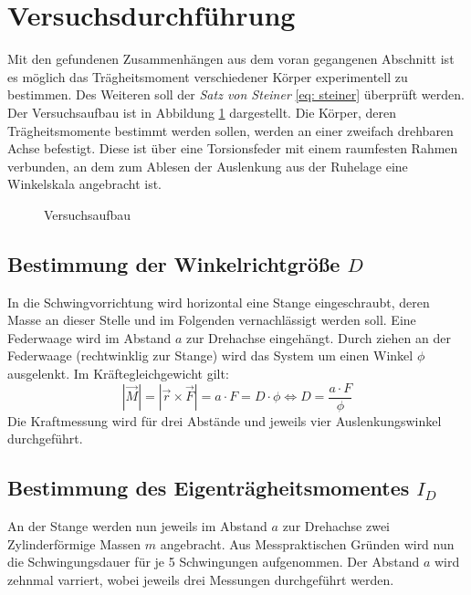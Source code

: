 \section{Versuchsdurchführung}
Mit den gefundenen Zusammenhängen aus dem voran gegangenen Abschnitt ist es
möglich das Trägheitsmoment verschiedener Körper experimentell zu bestimmen.
Des Weiteren soll der \textit{Satz von Steiner} \eqref{eq: steiner} überprüft
werden. \\
Der Versuchsaufbau ist in Abbildung \ref{fig: aufbau} dargestellt. Die Körper, deren
Trägheitsmomente bestimmt werden sollen, werden an einer zweifach drehbaren Achse
befestigt. Diese ist über eine Torsionsfeder mit einem raumfesten Rahmen verbunden,
an dem zum Ablesen der Auslenkung aus der Ruhelage eine Winkelskala angebracht ist.
\begin{figure}
  \centering
  \caption{Versuchsaufbau \cite{anleitung01}}
  \label{fig: aufbau}
\end{figure}


\subsection{Bestimmung der Winkelrichtgröße $D$}
In die Schwingvorrichtung wird horizontal eine Stange eingeschraubt, deren Masse an dieser
Stelle und im Folgenden vernachlässigt werden soll. Eine Federwaage wird im Abstand $a$ zur
Drehachse eingehängt. Durch ziehen an der Federwaage (rechtwinklig zur Stange) wird das System um einen Winkel $\phi$
ausgelenkt. Im Kräftegleichgewicht gilt:
\begin{equation}
  \left| \vec{M} \right| = \left|\vec{r} \times \vec{F} \right| = a \cdot F = D \cdot \phi \iff D = \frac{a \cdot F}{\phi}
\end{equation}
Die Kraftmessung wird für drei Abstände und jeweils vier Auslenkungswinkel durchgeführt.

\subsection{Bestimmung des Eigenträgheitsmomentes $I_D$}
An der Stange werden nun jeweils im Abstand $a$ zur Drehachse zwei Zylinderförmige
Massen $m$ angebracht. Aus Messpraktischen Gründen wird nun die Schwingungsdauer
für je 5 Schwingungen aufgenommen. Der Abstand $a$ wird zehnmal varriert, wobei jeweils
drei Messungen durchgeführt werden.

